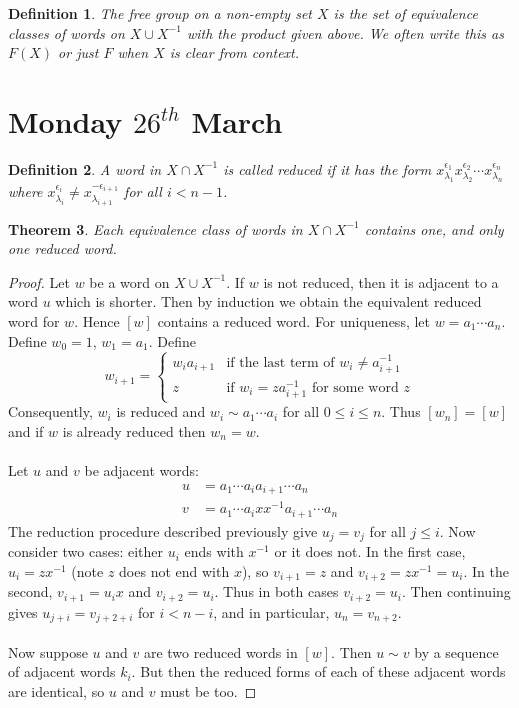 \documentclass[a4paper,10pt]{article}
\newtheorem{thm}{Theorem}
\newtheorem{Def}[thm]{Definition}
\begin{document}
\begin{Def}
The free group on a non-empty set $X$ is the set of equivalence classes of words on $X \cup X^{-1}$ with the product given above. We often write this as $F(X)$ or just $F$ when $X$ is clear from context.
\end{Def}

\newpage
\section{Monday $26^{th}$ March}

\begin{Def}
A word in $X \cap X^{-1}$ is called reduced if it has the form $x_{\lambda_1}^{\epsilon_1}x_{\lambda_2}^{\epsilon_2}\cdots x_{\lambda_n}^{\epsilon_n}$ where $x_{\lambda_i}^{\epsilon_i} \neq x_{\lambda_{i+1}}^{-\epsilon_{i+1}}$ for all $i < n-1$. 
\end{Def}

\begin{thm}
Each equivalence class of words in $X \cap X^{-1}$ contains one, and only one reduced word. 
\end{thm}

\begin{proof}
Let $w$ be a word on $X \cup X^{-1}$. If $w$ is not reduced, then it is adjacent to a word $u$ which is shorter. Then by induction we obtain the equivalent reduced word for $w$. Hence $[w]$ contains a reduced word. For uniqueness, let $w = a_1 \cdots a_n$. Define $w_0 = 1$, $w_1 = a_1$. Define 
\[ w_{i+1} = \begin{cases} w_{i} a_{i+1} & \text{if the last term of } w_i \neq a_{i+1}^{-1} \\
                          z              & \text{if } w_i = za_{i+1}^{-1} \text{ for some word } z
 \end{cases} \]
Consequently, $w_i$ is reduced and $w_i \sim a_1 \cdots a_i$ for all $0 \leq i \leq n$. Thus $[w_n] = [w]$ and if $w$ is already reduced then $w_n = w$. \\
\\
Let $u$ and $v$ be adjacent words:
\begin{align*}
u &= a_1 \cdots a_i a_{i+1} \cdots a_n \\
v &= a_1 \cdots a_i x x^{-1} a_{i+1} \cdots a_n
\end{align*}
The reduction procedure described previously give $u_j = v_j$ for all $j \leq i$. Now consider two cases: either $u_i$ ends with $x^{-1}$ or it does not. In the first case, $u_i = z x^{-1}$ (note $z$ does not end with $x$), so $v_{i+1} = z$ and $v_{i+2} = zx^{-1} = u_i$. In the second, $v_{i+1} = u_i x$ and $v_{i+2} = u_i$. Thus in both cases $v_{i+2} = u_i$. Then continuing gives $u_{j+i} = v_{j+2 + i}$ for $i < n - i$, and in particular, $u_n = v_{n + 2}$. \\
\\
Now suppose $u$ and $v$ are two reduced words in $[w]$. Then $u \sim v$ by a sequence of adjacent words $k_i$. But then the reduced forms of each of these adjacent words are identical, so $u$ and $v$ must be too. 
\end{proof}
\end{document}
